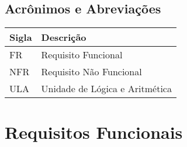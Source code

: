 \documentclass{report}
\begin{document}
  \subsection{Acrônimos e Abreviações}
    \FloatBarrier
    \begin{table}[H]
      \begin{center}
        \begin{tabular}[pos]{|m{2cm} | m{12cm}|} 
          \hline
          \cellcolor[gray]{0.9}\textbf{Sigla} & \cellcolor[gray]{0.9}\textbf{Descrição} \\ \hline
          FR      & Requisito Funcional  \\ \hline
          NFR     & Requisito Não Funcional  \\ \hline
          ULA     & Unidade de Lógica e Aritmética  \\ \hline
        \end{tabular}
      \end{center}
    \end{table}  

  \section{Requisitos Funcionais}
\end{document}
